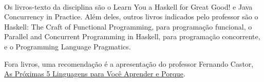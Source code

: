\documentclass[a4paper]{article}
\begin{document}
\paragraph{} Os livros-texto da disciplina são o Learn You a Haskell for Great Good!\cite{lipovaca2011learn} e Java Concurrency in Practice\cite{bloch2017effective}. Além deles, outros livros indicados pelo professor são o Haskell: The Craft of Functional Programming\cite{thompson2011haskell}, para programação funcional, o Parallel and Concurrent Programming in Haskell\cite{marlow2012parallel}, para programação concorrente, e o Programming Language Pragmatics\cite{scott2000programming}. 

Fora livros, uma recomendação é a apresentação do professor Fernando Castor, \href{http://www.youtube.com/watch?v=MsWmSCCVj5Y}{As Próximas 5 Linguagens para Você Aprender e Porque}. 



\end{document}
